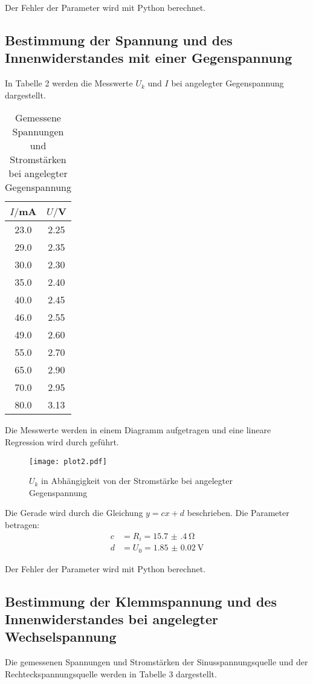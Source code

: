 Der Fehler der Parameter wird mit Python berechnet.


\subsection{Bestimmung der Spannung und des Innenwiderstandes mit einer Gegenspannung}

In Tabelle 2 werden die Messwerte $U_k$ und $I$ bei angelegter Gegenspannung dargestellt.

\begin{table}[H]
  \centering
  \caption{Gemessene Spannungen und Stromstärken bei angelegter Gegenspannung}
  \label{tab:gegenspannung}
  \begin{tabular}{c c}
    \toprule
    $I/$mA & $U/$V \\
    \midrule
    23.0  &  2.25 \\
    29.0  &  2.35 \\
    30.0  &  2.30 \\
    35.0  &  2.40 \\
    40.0  &  2.45 \\
    46.0  &  2.55 \\
    49.0  &  2.60 \\
    55.0  &  2.70 \\
    65.0  &  2.90 \\
    70.0  &  2.95 \\
    80.0  &  3.13 \\
    \bottomrule
  \end{tabular}
\end{table}

Die Messwerte werden in einem Diagramm aufgetragen und eine lineare Regression wird durch geführt.

\begin{figure}[H]
  \centering
  \texttt{[image: plot2.pdf]}
  \caption{$U_k$ in Abhängigkeit von der Stromstärke bei angelegter Gegenspannung }
  \label{fig:plot2}
\end{figure}

Die Gerade wird durch die Gleichung $y = cx + d$ beschrieben. Die Parameter betragen:
\begin{align*}
  c &= R_i = \SI{15.7(4)}{\ohm} \\
  d &= U_0 = \SI{1.85(2)}{\volt}
\end{align*}

Der Fehler der Parameter wird mit Python berechnet.


\subsection{Bestimmung der Klemmspannung und des Innenwiderstandes bei angelegter Wechselspannung}
Die gemessenen Spannungen und Stromstärken der Sinusspannungsquelle und der Rechteckspannungsquelle werden
in Tabelle 3 dargestellt.

